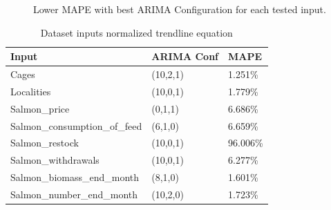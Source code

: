 \newpage

\begin{figure}[H]
    \caption{Lower MAPE with best ARIMA Configuration for each tested input.}
\end{figure}

\begin{table}[ht] 
	\centering
    \begin{tabular}{ | l | l | l |}
            \hline
Input							&	ARIMA Conf	&	MAPE	\\ \hline
Cages							&	(10,2,1)	&	1.251\%	\\ \hline
Localities						&	(10,0,1)	&	1.779\%	\\ \hline
Salmon\_price 					&	(0,1,1)		&	6.686\%	\\ \hline
Salmon\_consumption\_of\_feed	&	(6,1,0)		&	6.659\%	\\ \hline
Salmon\_restock 				&	(10,0,1)	&	96.006\%	\\ \hline
Salmon\_withdrawals 			&	(10,0,1)	&	6.277\%	\\ \hline
Salmon\_biomass\_end\_month		&	(8,1,0)		&	1.601\%	\\ \hline
Salmon\_number\_end\_month 		&	(10,2,0)	&	1.723\%	\\ \hline
    \end{tabular}  
    \caption{Dataset inputs normalized trendline equation}
    \label{table: Best ARIMA configurations with relative MAPE result in the Evaluation Test} 
\end{table}

\newpage

